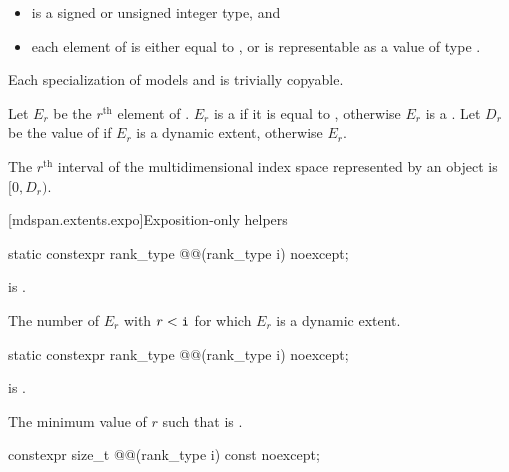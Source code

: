 \pnum
\mandates
\begin{itemize}
\item
{} is a signed or unsigned integer type, and
\item
each element of  is either equal to , or
is representable as a value of type .
\end{itemize}

\pnum
Each specialization of  models  and
is trivially copyable.

\pnum
Let $E_r$ be the $r^\text{th}$ element of .
$E_r$ is a  if it is equal to ,
otherwise $E_r$ is a .
Let $D_r$ be the value of 
if $E_r$ is a dynamic extent,
otherwise $E_r$.

\pnum
The $r^\text{th}$ interval of the multidimensional index space
represented by an  object is $[0, D_r)$.

[mdspan.extents.expo]{Exposition-only helpers}

\begin{itemdecl}
static constexpr rank_type @@(rank_type i) noexcept;
\end{itemdecl}

\begin{itemdescr}
\pnum
\expects
{} is .

\pnum
\returns
The number of $E_r$ with $r < \texttt{i}$ for which $E_r$ is a dynamic extent.
\end{itemdescr}

\begin{itemdecl}
static constexpr rank_type @@(rank_type i) noexcept;
\end{itemdecl}

\begin{itemdescr}
\pnum
\expects
{} is .

\pnum
\returns
The minimum value of $r$
such that  is .
\end{itemdescr}

\begin{itemdecl}
constexpr size_t @@(rank_type i) const noexcept;
\end{itemdecl}

